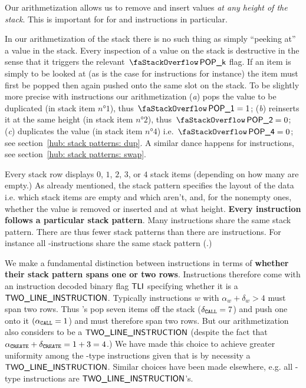 \saNote{}\label{note: touch stack items at any height} Our arithmetization allows us to remove and insert values \emph{at any height of the stack}. This is important for for  and  instructions in particular.

\saNote{} In our arithmetization of the stack there is no such thing as simply ``peeking at'' a value in the stack.
Every inspection of a value on the stack is destructive in the sense that it triggers the relevant $\stackItemPop{k}$ flag.
If an item is simply to be looked at (as is the case for  instructions for instance) the item must first be popped then again pushed onto the same slot on the stack.
To be slightly more precise with  instructions our arithmetization
(\emph{a}) pops the value to be duplicated (in stack item $n°1$), thus $\stackItemPop{1} = 1$;
(\emph{b}) reinserts it at the same height (in stack item $n°2$), thus $\stackItemPop{2} = 0$;
(\emph{c}) duplicates the value (in stack item $n°4$) i.e. $\stackItemPop{4} = 0$; see section~\ref{hub: stack patterns: dup}. A similar dance happens for  instructions, see section~\ref{hub: stack patterns: swap}.

Every stack row displays $0$, $1$, $2$, $3$, or $4$ stack items (depending on how many are empty.)
As already mentioned, the stack pattern specifies the layout of the data i.e. which stack items are empty and which aren't, and, for the nonempty ones, whether the value is removed or inserted and at what height.
\textbf{Every instruction follows a particular stack pattern}. Many instructions share the same stack pattern. There are thus fewer stack patterns than there are instructions. For instance all -instructions share the same stack pattern (\dupSP.)

We make a fundamental distinction between instructions in terms of \textbf{whether their stack pattern spans one or two rows}. Instructions therefore come with an instruction decoded binary flag $\textsf{TLI}$ specifying whether it is a $\textsf{TWO\_LINE\_INSTRUCTION}$. Typically instructions $w$ with $\alpha_{w} + \delta_{w} > 4$ must span two rows. Thus 's pop seven items off the stack ($\delta_{\texttt{CALL}} = 7$) and push one onto it $(\alpha_{\texttt{CALL}} = 1$) and must therefore span two rows. But our arithmetization also considers  to be a $\textsf{TWO\_LINE\_INSTRUCTION}$ (despite the fact that $\alpha_{\texttt{CREATE}} + \delta_{\texttt{CREATE}} = 1 + 3 = 4$.) We have made this choice to achieve greater uniformity among the -type instructions given that  is by necessity a $\textsf{TWO\_LINE\_INSTRUCTION}$. Similar choices have been made elsewhere, e.g. all -type instructions are $\textsf{TWO\_LINE\_INSTRUCTION}$'s.

